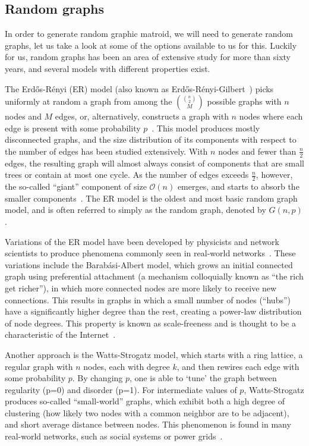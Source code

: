 \subsection{Random graphs}
In order to generate random graphic matroid, we will need to generate random graphs, let us take a look at some of the options available to us for this. Luckily for us, random graphs has been an area of extensive study for more than sixty years, and several models with different properties exist.

The Erdős-Rényi (ER) model (also known as Erdős-Rényi-Gilbert~\cite{fienberg-2012}) picks uniformly at random a graph from among the $\binom{\binom{n}{2}}{M}$ possible graphs with $n$ nodes and $M$ edges, or, alternatively, constructs a graph with $n$ nodes where each edge is present with some probability $p$~\cite{erdos-1959, gilbert-1959}. This model produces mostly disconnected graphs, and the size distribution of its components with respect to the number of edges has been studied extensively. With $n$ nodes and fewer than $\frac{n}{2}$ edges, the resulting graph will almost always consist of components that are small trees or contain at most one cycle. As the number of edges exceeds $\frac{n}{2}$, however, the so-called ``giant'' component of size $\mathcal{O}(n)$ emerges, and starts to absorb the smaller components~\cite{janson1993birth}. The ER model is the oldest and most basic random graph model, and is often referred to simply as the random graph, denoted by $G(n,p)$.

Variations of the ER model have been developed by physicists and network scientists to produce phenomena commonly seen in real-world networks~\cite{fienberg-2012}. These variations include the Barabási-Albert model, which grows an initial connected graph using preferential attachment (a mechanism colloquially known as ``the rich get richer''), in which more connected nodes are more likely to receive new connections. This results in graphs in which a small number of nodes (``hubs'') have a significantly higher degree than the rest, creating a power-law distribution of node degrees. This property is known as scale-freeness and is thought to be a characteristic of the Internet~\cite{barabasi-albert}. 

Another approach is the Watts-Strogatz model, which starts with a ring lattice, a regular graph with $n$ nodes, each with degree $k$, and then rewires each edge with some probability $p$. By changing $p$, one is able to `tune' the graph between regularity (p=0) and disorder (p=1). For intermediate values of $p$, Watts-Strogatz produces so-called ``small-world'' graphs, which exhibit both a high degree of clustering (how likely two nodes with a common neighbor are to be adjacent), and short average distance between nodes. This phenomenon is found in many real-world networks, such as social systems or power grids~\cite{Watts-1998}.

